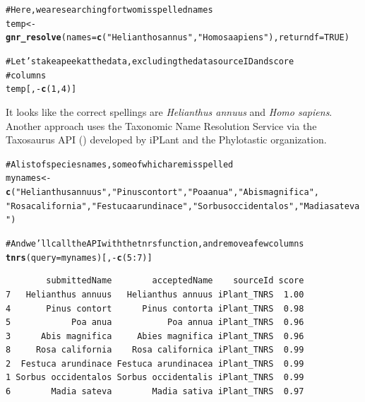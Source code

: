 \documentclass[letterpaper,superscriptaddress,showkeys,longbibliography,10pt]{revtex4-1}\usepackage{graphicx, color}
\makeatletter
\newcommand{\hlfunctioncall}[1]{\textcolor[rgb]{0.501960784313725,0,0.329411764705882}{\textbf{#1}}}%
\newcommand{\hlstring}[1]{\textcolor[rgb]{0.6,0.6,1}{#1}}%
\newcommand{\hlcomment}[1]{\textcolor[rgb]{0.180392156862745,0.6,0.341176470588235}{#1}}%
\newenvironment{kframe}{%
 \def\at@end@of@kframe{}%
 \ifinner\ifhmode%
  \def\at@end@of@kframe{\end{minipage}}%
  \begin{minipage}{\columnwidth}%
 \fi\fi%
 \def\FrameCommand##1{\hskip\@totalleftmargin \hskip-\fboxsep
 \colorbox{shadecolor}{##1}\hskip-\fboxsep
     \hskip-\linewidth \hskip-\@totalleftmargin \hskip\columnwidth}%
 \MakeFramed {\advance\hsize-\width
   \@totalleftmargin\z@ \linewidth\hsize
   \@setminipage}}%
 {\par\unskip\endMakeFramed%
 \at@end@of@kframe}
\newenvironment{knitrout}{}{} %
\makeatother
\begin{document}
\begin{knitrout}
\color{fgcolor}\begin{kframe}
\begin{alltt}
\hlcomment{# Here, we are searching for two misspelled names}
temp <- \hlfunctioncall{gnr_resolve}(names = \hlfunctioncall{c}(\hlstring{"Helianthos annus"}, \hlstring{"Homo saapiens"}), returndf = TRUE)

\hlcomment{# Let's take a peek at the data, excluding the data source ID and score}
\hlcomment{# columns}
temp[, -\hlfunctioncall{c}(1, 4)]
\end{alltt}
\end{kframe}
\end{knitrout}


It looks like the correct spellings are \emph{Helianthus annuus} and \emph{Homo sapiens}. Another approach uses the Taxonomic Name Resolution Service via the Taxosaurus API (\cite{taxosaurus}) developed by iPLant and the Phylotastic organization.

\begin{knitrout}
\color{fgcolor}\begin{kframe}
\begin{alltt}
\hlcomment{# A list of species names, some of which are misspelled}
mynames <- \hlfunctioncall{c}(\hlstring{"Helianthus annuus"}, \hlstring{"Pinus contort"}, \hlstring{"Poa anua"}, \hlstring{"Abis magnifica"}, 
    \hlstring{"Rosa california"}, \hlstring{"Festuca arundinace"}, \hlstring{"Sorbus occidentalos"}, \hlstring{"Madia sateva"})

\hlcomment{# And we'll call the API with the tnrs function, and remove a few columns}
\hlfunctioncall{tnrs}(query = mynames)[, -\hlfunctioncall{c}(5:7)]
\end{alltt}
\begin{verbatim}
        submittedName        acceptedName    sourceId score
7   Helianthus annuus   Helianthus annuus iPlant_TNRS  1.00
4       Pinus contort      Pinus contorta iPlant_TNRS  0.98
5            Poa anua           Poa annua iPlant_TNRS  0.96
3      Abis magnifica     Abies magnifica iPlant_TNRS  0.96
8     Rosa california    Rosa californica iPlant_TNRS  0.99
2  Festuca arundinace Festuca arundinacea iPlant_TNRS  0.99
1 Sorbus occidentalos Sorbus occidentalis iPlant_TNRS  0.99
6        Madia sateva        Madia sativa iPlant_TNRS  0.97
\end{verbatim}
\end{kframe}
\end{knitrout}
\end{document}
